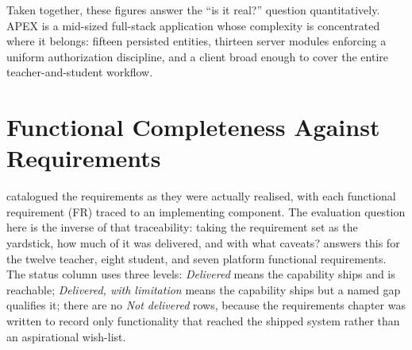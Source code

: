 Taken together, these figures answer the ``is it real?'' question quantitatively.
APEX is a mid-sized full-stack application whose complexity is concentrated where it
belongs: fifteen persisted entities, thirteen server modules enforcing a uniform
authorization discipline, and a client broad enough to cover the entire
teacher-and-student workflow.

\section{Functional Completeness Against Requirements}
\label{sec:res-functional}

 catalogued the requirements as they were actually realised, with each
functional requirement (FR) traced to an implementing component. The evaluation
question here is the inverse of that traceability: taking the requirement set as the
yardstick, how much of it was delivered, and with what caveats? 
answers this for the twelve teacher, eight student, and seven platform functional
requirements. The status column uses three levels: \emph{Delivered} means the
capability ships and is reachable; \emph{Delivered, with limitation} means the
capability ships but a named gap qualifies it; there are no
\emph{Not delivered} rows, because the requirements chapter was written to record
only functionality that reached the shipped system rather than an aspirational
wish-list.

